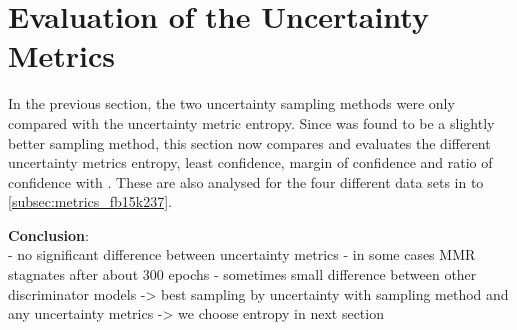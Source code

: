 \section{Evaluation of the Uncertainty Metrics}
\label{ch:evaluation:sec:evaluation_metrics}

In the previous section, the two uncertainty sampling methods were only compared with the uncertainty metric entropy.
Since \ussoftmax was found to be a slightly better sampling method, this section now compares and evaluates the different uncertainty metrics entropy, least confidence, margin of confidence and ratio of confidence with \ussoftmax. 
These are also analysed for the four different data sets in  to \ref{subsec:metrics_fb15k237}.









\textbf{Conclusion}:\\

- no significant difference between uncertainty metrics
- in some cases MMR stagnates after about 300 epochs
- sometimes small difference between other discriminator models
-> best sampling by uncertainty with sampling method \ussoftmax and any uncertainty metrics -> we choose entropy
in next section
